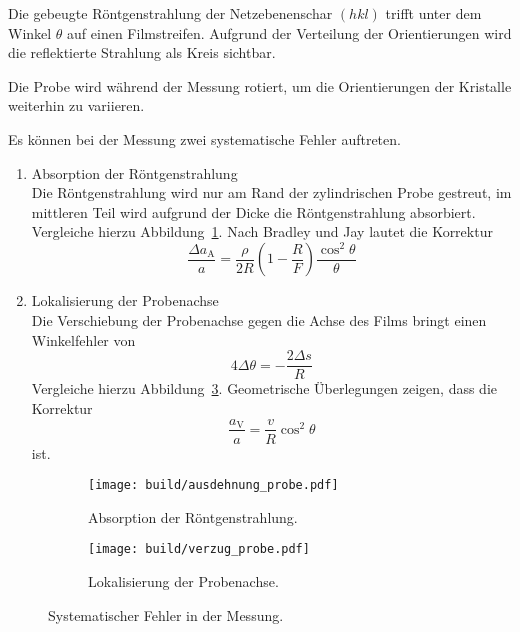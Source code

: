 Die gebeugte Röntgenstrahlung der Netzebenenschar $(hkl)$ trifft unter
dem Winkel $\theta$ auf einen Filmstreifen.
Aufgrund der Verteilung der Orientierungen wird die reflektierte Strahlung
als Kreis sichtbar.

Die Probe wird während der Messung rotiert, um die Orientierungen der Kristalle
weiterhin zu variieren.

Es können bei der Messung zwei systematische Fehler auftreten.
\begin{enumerate}
  \item\label{item:absorption} Absorption der Röntgenstrahlung \\
    Die Röntgenstrahlung wird nur am Rand der zylindrischen Probe gestreut,
    im mittleren Teil wird aufgrund der Dicke die Röntgenstrahlung absorbiert.
    Vergleiche hierzu Abbildung~\ref{fig:fehler_absorption}.
    Nach Bradley und Jay\cite{bradleyjay} lautet die Korrektur
    \begin{equation}
      \label{eq:korrektur_lokalisation}
      \frac{\Delta a_\text{A}}{a} = \frac{\rho}{2R}\left(1 - \frac{R}{F}\right) \frac{\cos^2\!\theta}{\theta}
    \end{equation}
  \item\label{item:lokalisierung} Lokalisierung der Probenachse \\
    Die Verschiebung der Probenachse gegen die Achse des Films bringt
    einen Winkelfehler von
    \begin{equation}
      4 \Delta \theta = -\frac{2 \Delta s}{R}
    \end{equation}
    Vergleiche hierzu Abbildung~\ref{fig:fehler_lokalisation}.
    Geometrische Überlegungen zeigen, dass die Korrektur
    \begin{equation}
      \frac{a_\text{V}}{a} = \frac{v}{R} \cos^2\!{\theta}
    \end{equation}
    ist.
\end{enumerate}

\begin{figure}
  \centering
  \begin{subfigure}[b]{0.48\textwidth}
    \centering
    \texttt{[image: build/ausdehnung\_probe.pdf]}
    \caption{%
      Absorption der Röntgenstrahlung.
    }%
    \label{fig:fehler_absorption}
  \end{subfigure}
  \begin{subfigure}[b]{0.48\textwidth}
    \centering
    \texttt{[image: build/verzug\_probe.pdf]}
    \caption{%
      Lokalisierung der Probenachse.
    }%
    \label{fig:fehler_lokalisation}
  \end{subfigure}
  \caption{%
    Systematischer Fehler in der Messung.\cite{anleitung}
  }
\end{figure}


